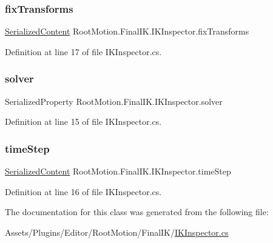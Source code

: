 \subsubsection{\texorpdfstring{fix\+Transforms}{fixTransforms}}
{\footnotesize\ttfamily \mbox{\hyperlink{struct_root_motion_1_1_serialized_content}{Serialized\+Content}} Root\+Motion.\+Final\+I\+K.\+I\+K\+Inspector.\+fix\+Transforms\hspace{0.3cm}{\ttfamily [protected]}}



Definition at line 17 of file I\+K\+Inspector.\+cs.

\mbox{\label{class_root_motion_1_1_final_i_k_1_1_i_k_inspector_a23d050c4ae7cb036f580a9dc9bc8763b}} 
\subsubsection{\texorpdfstring{solver}{solver}}
{\footnotesize\ttfamily Serialized\+Property Root\+Motion.\+Final\+I\+K.\+I\+K\+Inspector.\+solver\hspace{0.3cm}{\ttfamily [protected]}}



Definition at line 15 of file I\+K\+Inspector.\+cs.

\mbox{\label{class_root_motion_1_1_final_i_k_1_1_i_k_inspector_a9740af7bf75f6214f6d2963834f440d5}} 
\subsubsection{\texorpdfstring{time\+Step}{timeStep}}
{\footnotesize\ttfamily \mbox{\hyperlink{struct_root_motion_1_1_serialized_content}{Serialized\+Content}} Root\+Motion.\+Final\+I\+K.\+I\+K\+Inspector.\+time\+Step\hspace{0.3cm}{\ttfamily [protected]}}



Definition at line 16 of file I\+K\+Inspector.\+cs.



The documentation for this class was generated from the following file\+:\begin{DoxyCompactItemize}
\item 
Assets/\+Plugins/\+Editor/\+Root\+Motion/\+Final\+I\+K/\mbox{\hyperlink{_i_k_inspector_8cs}{I\+K\+Inspector.\+cs}}\end{DoxyCompactItemize}
